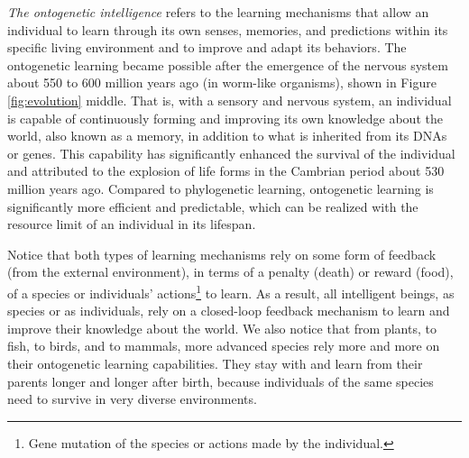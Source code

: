 \documentclass[\toplevelprefix/book-main.tex]{subfiles}
\begin{document}
{\em The ontogenetic intelligence} refers to the learning mechanisms that allow an individual to learn through its own senses, memories, and predictions within its specific living environment and to improve and adapt its behaviors. The ontogenetic learning became possible after the emergence of the nervous system about 550 to 600 million years ago (in worm-like organisms), shown in Figure \ref{fig:evolution} middle. That is, with a sensory and nervous system, an individual is capable of continuously forming and improving its own knowledge about the world, also known as a memory, in addition to what is inherited from its DNAs or genes. This capability has significantly enhanced the survival of the individual and attributed to the explosion of life forms in the Cambrian period about 530 million years ago.  Compared to phylogenetic learning, ontogenetic learning is significantly more efficient and predictable, which can be realized with the resource limit of an individual in its lifespan.

Notice that both types of learning mechanisms rely on some form of feedback (from the external environment), in terms of a penalty (death) or reward (food), of a species or individuals' actions\footnote{Gene mutation of the species or actions made by the individual.} to learn. As a result, all intelligent beings, as species or as individuals, rely on a closed-loop feedback mechanism to learn and improve their knowledge about the world. We also notice that from plants, to fish, to birds, and to mammals, more advanced species rely more and more on their ontogenetic learning capabilities. They stay with and learn from their parents longer and longer after birth, because individuals of the same species need to survive in very diverse environments. 
\end{document}
